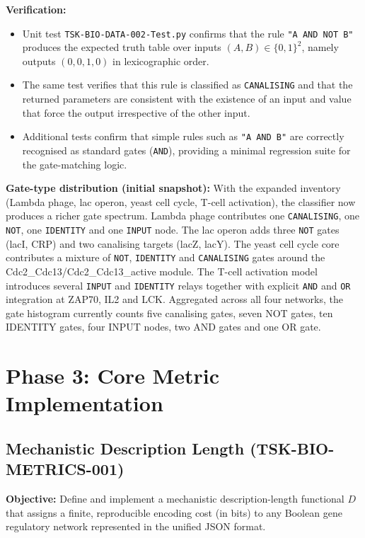 \documentclass{article}
\begin{document}
\textbf{Verification:}
\begin{itemize}
    \item Unit test \texttt{TSK-BIO-DATA-002-Test.py} confirms that the rule \texttt{"A AND NOT B"} produces the expected truth table over inputs $(A,B) \in \{0,1\}^2$, namely outputs $(0,0,1,0)$ in lexicographic order.
    \item The same test verifies that this rule is classified as \texttt{CANALISING} and that the returned parameters are consistent with the existence of an input and value that force the output irrespective of the other input.
    \item Additional tests confirm that simple rules such as \texttt{"A AND B"} are correctly recognised as standard gates (\texttt{AND}), providing a minimal regression suite for the gate-matching logic.
\end{itemize}

\textbf{Gate-type distribution (initial snapshot):}
With the expanded inventory (Lambda phage, lac operon, yeast cell cycle, T-cell activation), the classifier now produces a richer gate spectrum. Lambda phage contributes one \texttt{CANALISING}, one \texttt{NOT}, one \texttt{IDENTITY} and one \texttt{INPUT} node. The lac operon adds three \texttt{NOT} gates (lacI, CRP) and two canalising targets (lacZ, lacY). The yeast cell cycle core contributes a mixture of \texttt{NOT}, \texttt{IDENTITY} and \texttt{CANALISING} gates around the Cdc2\_Cdc13/Cdc2\_Cdc13\_active module. The T-cell activation model introduces several \texttt{INPUT} and \texttt{IDENTITY} relays together with explicit \texttt{AND} and \texttt{OR} integration at ZAP70, IL2 and LCK. Aggregated across all four networks, the gate histogram currently counts five canalising gates, seven NOT gates, ten IDENTITY gates, four INPUT nodes, two AND gates and one OR gate.

\section{Phase 3: Core Metric Implementation}

\subsection{Mechanistic Description Length (TSK-BIO-METRICS-001)}
\textbf{Objective:} Define and implement a mechanistic description-length functional $D$ that assigns a finite, reproducible encoding cost (in bits) to any Boolean gene regulatory network represented in the unified JSON format.
\end{document}
